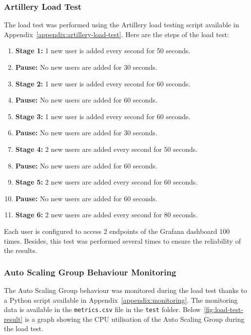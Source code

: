 \documentclass[12pt,oneside]{book} %
\begin{document}
\subsubsection{Artillery Load Test}
The load test was performed using the Artillery load testing script available
in Appendix~\ref{appendix:artillery-load-test}. Here are the steps of the load
test:
\begin{enumerate}
    \item \textbf{Stage 1:} 1 new user is added every second for 50 seconds.
    \item \textbf{Pause:} No new users are added for 30 seconds.
    \item \textbf{Stage 2:} 1 new user is added every second for 60 seconds.
    \item \textbf{Pause:} No new users are added for 60 seconds.
    \item \textbf{Stage 3:} 1 new user is added every second for 60 seconds.
    \item \textbf{Pause:} No new users are added for 30 seconds.
    \item \textbf{Stage 4:} 2 new users are added every second for 50 seconds.
    \item \textbf{Pause:} No new users are added for 60 seconds.
    \item \textbf{Stage 5:} 2 new users are added every second for 60 seconds.
    \item \textbf{Pause:} No new users are added for 60 seconds.
    \item \textbf{Stage 6:} 2 new users are added every second for 80 seconds.
\end{enumerate}
Each user is configured to access 2 endpoints of the Grafana dashboard 100 times. Besides, this test was performed several times to ensure the reliability of the results.

\subsubsection{Auto Scaling Group Behaviour Monitoring}
The Auto Scaling Group behaviour was monitored during the load test thanks to a
Python script available in Appendix~\ref{appendix:monitoring}. The monitoring
data is available in the \texttt{metrics.csv} file in the \texttt{test} folder.
Below~\ref{fig:load-test-result} is a graph showing the CPU utilisation of the
Auto Scaling Group during the load test.
\end{document}
